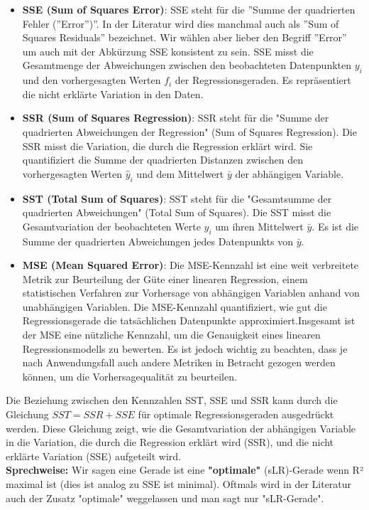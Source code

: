 \documentclass[12pt]{article}
\begin{document}
\begin{itemize}
\item \textbf{SSE (Sum of Squares Error)}: SSE steht für die ”Summe der quadrierten Fehler (”Error”)”. In der Literatur wird dies manchmal auch als ”Sum of Squares Residuals” bezeichnet. Wir wählen aber lieber den Begriff ”Error” um auch mit der Abkürzung SSE konsistent zu sein. SSE misst die Gesamtmenge der Abweichungen zwischen den beobachteten Datenpunkten $y_i$ und den vorhergesagten Werten $ f_i $ der Regressionsgeraden. Es repräsentiert die nicht erklärte Variation in den Daten. 
    
\item \textbf{SSR (Sum of Squares Regression)}: SSR steht für die "Summe der quadrierten Abweichungen der Regression" (Sum of Squares Regression). Die SSR misst die Variation, die durch die Regression erklärt wird. Sie quantifiziert die Summe der quadrierten Distanzen zwischen den vorhergesagten Werten \(\hat{y}_i\) und dem Mittelwert \(\bar{y}\) der abhängigen Variable.
    
\item \textbf{SST (Total Sum of Squares)}: SST steht für die "Gesamtsumme der quadrierten Abweichungen" (Total Sum of Squares). Die SST misst die Gesamtvariation der beobachteten Werte \(y_i\) um ihren Mittelwert \(\bar{y}\). Es ist die Summe der quadrierten Abweichungen jedes Datenpunkts von \(\bar{y}\).

\item \textbf{MSE (Mean Squared Error)}: Die MSE-Kennzahl ist eine weit verbreitete Metrik zur Beurteilung der Güte einer linearen Regression, einem statistischen Verfahren zur Vorhersage von abhängigen Variablen anhand von unabhängigen Variablen. Die MSE-Kennzahl quantifiziert, wie gut die Regressionsgerade die tatsächlichen Datenpunkte approximiert.Insgesamt ist der MSE eine nützliche Kennzahl, um die Genauigkeit eines linearen Regressionsmodells zu bewerten. Es ist jedoch wichtig zu beachten, dass je nach Anwendungsfall auch andere Metriken in Betracht gezogen werden können, um die Vorhersagequalität zu beurteilen.
\end{itemize}
%
Die Beziehung zwischen den Kennzahlen SST, SSE und SSR kann durch die Gleichung \(SST = SSR + SSE\) für optimale Regressionsgeraden ausgedrückt werden. Diese Gleichung zeigt, wie die Gesamtvariation der abhängigen Variable in die Variation, die durch die Regression erklärt wird (SSR), und die nicht erklärte Variation (SSE) aufgeteilt wird.\\[0.2 cm]
% 
\textbf{Sprechweise:} Wir sagen eine Gerade ist eine \textbf{"optimale"} (sLR)-Gerade wenn R² maximal ist (dies ist analog zu SSE ist minimal). Oftmals wird in der Literatur auch der Zusatz "optimale" weggelassen und man sagt nur "sLR-Gerade".\\[0.4 cm]
\end{document}
